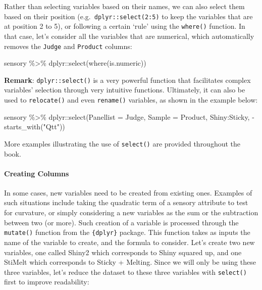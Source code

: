 \documentclass[
]{book}
\newenvironment{Shaded}{\begin{snugshade}}{\end{snugshade}}
\newcommand{\AttributeTok}[1]{\textcolor[rgb]{0.77,0.63,0.00}{#1}}
\newcommand{\FunctionTok}[1]{\textcolor[rgb]{0.00,0.00,0.00}{#1}}
\newcommand{\NormalTok}[1]{#1}
\newcommand{\SpecialCharTok}[1]{\textcolor[rgb]{0.00,0.00,0.00}{#1}}
\newcommand{\StringTok}[1]{\textcolor[rgb]{0.31,0.60,0.02}{#1}}
\begin{document}
Rather than selecting variables based on their names, we can also select them based on their position (e.g.~\texttt{dplyr::select(2:5)} to keep the variables that are at position 2 to 5), or following a certain `rule' using the \texttt{where()} function. In that case, let's consider all the variables that are numerical, which automatically removes the \texttt{Judge} and \texttt{Product} columns:

\begin{Shaded}
\begin{Highlighting}[]
\NormalTok{sensory }\SpecialCharTok{\%\textgreater{}\%} 
\NormalTok{  dplyr}\SpecialCharTok{::}\FunctionTok{select}\NormalTok{(}\FunctionTok{where}\NormalTok{(is.numeric))}
\end{Highlighting}
\end{Shaded}

\textbf{Remark}: \texttt{dplyr::select()} is a very powerful function that facilitates complex variables' selection through very intuitive functions. Ultimately, it can also be used to \texttt{relocate()} and even \texttt{rename()} variables, as shown in the example below:

\begin{Shaded}
\begin{Highlighting}[]
\NormalTok{sensory }\SpecialCharTok{\%\textgreater{}\%} 
\NormalTok{  dplyr}\SpecialCharTok{::}\FunctionTok{select}\NormalTok{(}\AttributeTok{Panellist =}\NormalTok{ Judge, }\AttributeTok{Sample =}\NormalTok{ Product, Shiny}\SpecialCharTok{:}\NormalTok{Sticky, }\SpecialCharTok{{-}}\FunctionTok{starts\_with}\NormalTok{(}\StringTok{"Qtt"}\NormalTok{))}
\end{Highlighting}
\end{Shaded}

More examples illustrating the use of \texttt{select()} are provided throughout the book.

\hypertarget{creating-columns}{%
\paragraph{Creating Columns}\label{creating-columns}}

In some cases, new variables need to be created from existing ones. Examples of such situations include taking the quadratic term of a sensory attribute to test for curvature, or simply considering a new variables as the sum or the subtraction between two (or more). Such creation of a variable is processed through the \texttt{mutate()} function from the \texttt{\{dplyr\}} package. This function takes as inputs the name of the variable to create, and the formula to consider.
Let's create two new variables, one called Shiny2 which corresponds to Shiny squared up, and one StiMelt which corresponds to Sticky + Melting. Since we will only be using these three variables, let's reduce the dataset to these three variables with \texttt{select()} first to improve readability:
\end{document}
